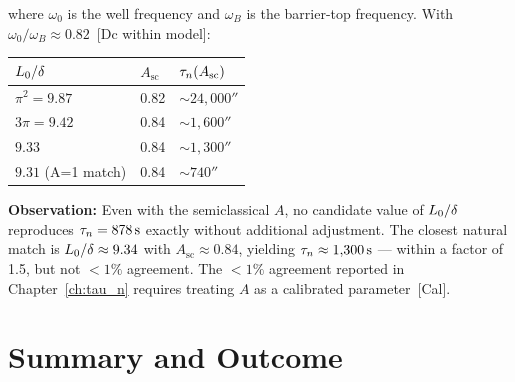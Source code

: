 where $\omega_0$ is the well frequency and $\omega_B$ is the barrier-top frequency.
With $\omega_0/\omega_B \approx 0.82$~[Dc within model]:
\begin{center}
\begin{tabular}{lll}
\toprule
$L_0/\delta$ & $A_{\text{sc}}$ & $\tau_n(A_{\text{sc}})$ \\
\midrule
$\pi^2 = 9.87$  & 0.82 & $\sim 24{,}000\second$ \\
$3\pi = 9.42$   & 0.84 & $\sim 1{,}600\second$  \\
$9.33$           & 0.84 & $\sim 1{,}300\second$  \\
$9.31$ (A=1 match) & 0.84 & $\sim 740\second$  \\
\bottomrule
\end{tabular}
\end{center}

\textbf{Observation:} Even with the semiclassical $A$, no candidate value of
$L_0/\delta$ reproduces $\tau_n = 878\,\mathrm{s}$ exactly without additional
adjustment. The closest natural match is $L_0/\delta \approx 9.34$ with
$A_{\text{sc}} \approx 0.84$, yielding $\tau_n \approx 1{,}300\,\mathrm{s}$ --- within
a factor of 1.5, but not $< 1\%$ agreement. The $< 1\%$ agreement reported in
Chapter~\ref{ch:tau_n} requires treating $A$ as a calibrated parameter~[Cal].

\section{Summary and Outcome}
\label{sec:L0d:outcome}

